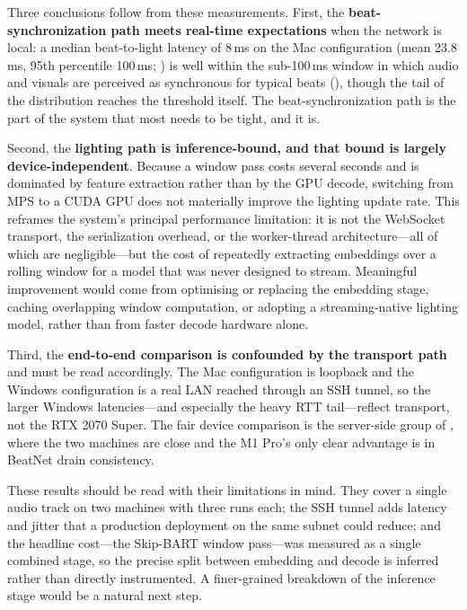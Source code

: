Three conclusions follow from these measurements. First, the \textbf{beat-synchronization path meets real-time expectations} when the network is local: a median beat-to-light latency of 8\,ms on the Mac configuration (mean 23.8\,ms, 95th percentile 100\,ms; ) is well within the sub-100\,ms window in which audio and visuals are perceived as synchronous for typical beats (), though the tail of the distribution reaches the threshold itself. The beat-synchronization path is the part of the system that most needs to be tight, and it is.

Second, the \textbf{lighting path is inference-bound, and that bound is largely device-independent}. Because a window pass costs several seconds and is dominated by feature extraction rather than by the GPU decode, switching from MPS to a CUDA GPU does not materially improve the lighting update rate. This reframes the system's principal performance limitation: it is not the WebSocket transport, the serialization overhead, or the worker-thread architecture---all of which are negligible---but the cost of repeatedly extracting embeddings over a rolling window for a model that was never designed to stream. Meaningful improvement would come from optimising or replacing the embedding stage, caching overlapping window computation, or adopting a streaming-native lighting model, rather than from faster decode hardware alone.

Third, the \textbf{end-to-end comparison is confounded by the transport path} and must be read accordingly. The Mac configuration is loopback and the Windows configuration is a real LAN reached through an SSH tunnel, so the larger Windows latencies---and especially the heavy RTT tail---reflect transport, not the RTX 2070 Super. The fair device comparison is the server-side group of , where the two machines are close and the M1 Pro's only clear advantage is in BeatNet drain consistency.

These results should be read with their limitations in mind. They cover a single audio track on two machines with three runs each; the SSH tunnel adds latency and jitter that a production deployment on the same subnet could reduce; and the headline cost---the Skip-BART window pass---was measured as a single combined stage, so the precise split between embedding and decode is inferred rather than directly instrumented. A finer-grained breakdown of the inference stage would be a natural next step.
